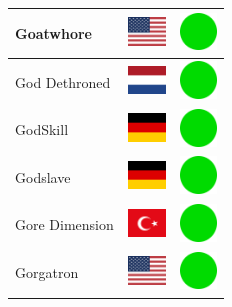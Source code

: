 \documentclass[12pt, a4paper, twoside]{report}
\begin{document}
\begin{center}
\begin{longtable}{|p{5cm}|p{2cm}|p{2cm}|}
 Goatwhore                                                  & \includegraphics[width=1cm]{../4x3/us} &   \includegraphics[width=1cm]{../likes/y} \\ \hline
 God Dethroned                                              & \includegraphics[width=1cm]{../4x3/nl} &   \includegraphics[width=1cm]{../likes/y} \\ \hline
 GodSkill                                                   & \includegraphics[width=1cm]{../4x3/de} &   \includegraphics[width=1cm]{../likes/y} \\ \hline
 Godslave                                                   & \includegraphics[width=1cm]{../4x3/de} &   \includegraphics[width=1cm]{../likes/y} \\ \hline
 Gore Dimension                                             & \includegraphics[width=1cm]{../4x3/tr} &   \includegraphics[width=1cm]{../likes/y} \\ \hline
 Gorgatron                                                  & \includegraphics[width=1cm]{../4x3/us} &   \includegraphics[width=1cm]{../likes/y} \\ \hline

\end{longtable}
\end{center}
\end{document}
